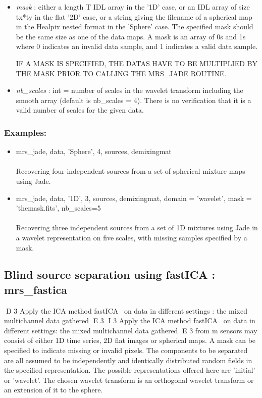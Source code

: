 \begin{itemize}
\item {\em mask} : either a length T IDL array in the '1D' case, or an IDL array of size tx*ty in the flat '2D' case, 
or a string giving the filename of a spherical map in the Healpix nested format in the 'Sphere' case. The specified 
mask should be the same size as one of the data maps. A mask is an array of 0s and 1s where 0 indicates an invalid 
data sample, and 1 indicates a valid data sample.

IF A MASK IS SPECIFIED, THE DATAS HAVE TO BE MULTIPLIED BY THE MASK PRIOR TO CALLING THE MRS\_JADE ROUTINE.

\item {\em nb\_scales} : int = number of scales in the wavelet transform including the smooth array (default is nb\_scales = 4). There is no verification that it is a valid number of scales for the given data.

\end{itemize}


\subsubsection*{Examples:} 
\begin{itemize}
\item mrs\_jade, data, 'Sphere', 4, sources, demixingmat\\\\
Recovering four independent sources from a set of spherical mixture maps using Jade.  

\item   mrs\_jade, data, '1D', 3, sources, demixingmat, domain = 'wavelet', mask = 'themask.fits', nb\_scales=5\\\\
Recovering three independent sources from a set of 1D mixtures using Jade in a wavelet representation on five scales, with missing samples specified by a mask.  

\end{itemize}



\subsection{Blind source separation using fastICA : mrs\_fastica}
D 3
Apply the ICA method fastICA~\cite{ica:icabook} on data in different settings : the mixed multichannel data gathered 
E 3
I 3
Apply the ICA method fastICA~\citep{ica:icabook} on data in different settings: the mixed multichannel data gathered 
E 3
from m sensors may consist of either 1D time series, 2D flat images or spherical maps. A mask can be specified to 
indicate missing or invalid pixels. The components to be separated are all assumed to be independently and identically 
distributed random fields in the specified representation. The possible representations offered here are 'initial' 
or 'wavelet'. The chosen wavelet transform is an orthogonal wavelet transform or an extension of it to the sphere.

